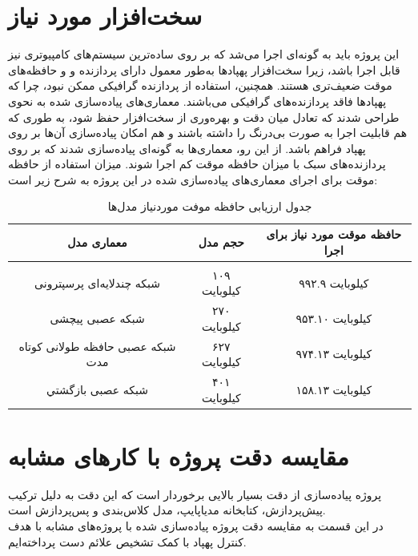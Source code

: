 \section{سخت‌افزار مورد نیاز}
این پروژه باید به گونه‌ای اجرا می‌شد که بر روی ساده‌ترین سیستم‌های کامپیوتری نیز قابل اجرا باشد، زیرا سخت‌افزار پهپادها به‌طور معمول دارای پردازنده‌ و و حافظه‌های موقت 
ضعیف‌تری هستند. همچنین، استفاده از پردازنده گرافیکی ممکن نبود، چرا که پهپادها فاقد پردازنده‌های گرافیکی می‌باشند. 
معماری‌های پیاده‌سازی شده به نحوی طراحی شدند که تعادل میان دقت و بهره‌وری از سخت‌افزار حفظ شود، به طوری که هم قابلیت اجرا به صورت بی‌درنگ را داشته باشند و هم امکان پیاده‌سازی آن‌ها بر روی پهپاد فراهم باشد. از این رو، معماری‌ها به گونه‌ای پیاده‌سازی شدند که بر روی پردازنده‌های سبک با میزان حافظه موقت کم اجرا شوند.
میزان استفاده از حافظه موقت برای اجرای معماری‌های پیاده‌سازی شده در این پروژه به شرح زیر است:



\begin{table}[h!]
    \centering
    \begin{tabular}{||c c c||}
     \hline
     \rule{0pt}{3ex}معماری مدل & حجم مدل & حافظه موقت مورد نیاز برای اجرا \\ [1.5ex]
     \hline
     \hline
     \rule{0pt}{0.5ex} & & \\  %
     شبکه چندلایه‌ای پرسپترونی & ۱۰۹ کیلوبایت & ۹۹۲.۹ کیلوبایت \\ [2.5ex]
     شبکه عصبی پیچشی & ۲۷۰ کیلوبایت & ۹۵۳.۱۰ کیلوبایت \\ [2.5ex]
     شبکه عصبی  حافظه طولانی کوتاه مدت & ۶۲۷ کیلوبایت & ۹۷۴.۱۳ کیلوبایت \\ [2.5ex]
     شبکه عصبی بازگشتي & ۴۰۱ کیلوبایت & ۱۵۸.۱۳ کیلوبایت \\ [2.5ex]
     \hline
    \end{tabular}
    \caption{جدول ارزیابی حافظه موفت موردنیاز مدل‌ها}
    \label{table:4}
\end{table}

\section{مقایسه دقت پروژه با کارهای مشابه}
پروژه پیاده‌سازی از دقت بسیار بالایی برخوردار است که این دقت به دلیل ترکیب پیش‌پردازش، کتابخانه مدیاپایپ، مدل کلاس‌بندی و پس‌پردازش است. 
\\ در این قسمت به مقایسه دقت پروژه پیاده‌سازی شده با پروژه‌های مشابه با هدف کنترل پهپاد با کمک تشخیص علائم دست پرداخته‌ایم.

